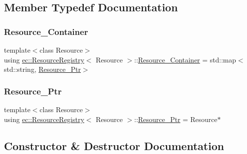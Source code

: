 \subsection{Member Typedef Documentation}
\mbox{\label{classec_1_1_resource_registry_a0a2b5090a2bbc638a04a2c283812b956}} 
\subsubsection{\texorpdfstring{Resource\+\_\+\+Container}{Resource\_Container}}
{\footnotesize\ttfamily template$<$class Resource$>$ \\
using \mbox{\hyperlink{classec_1_1_resource_registry}{ec\+::\+Resource\+Registry}}$<$ Resource $>$\+::\mbox{\hyperlink{classec_1_1_resource_registry_a0a2b5090a2bbc638a04a2c283812b956}{Resource\+\_\+\+Container}} =  std\+::map$<$std\+::string, \mbox{\hyperlink{classec_1_1_resource_registry_a77cf5381229bff47d251603c783115fe}{Resource\+\_\+\+Ptr}}$>$}

\mbox{\label{classec_1_1_resource_registry_a77cf5381229bff47d251603c783115fe}} 
\subsubsection{\texorpdfstring{Resource\+\_\+\+Ptr}{Resource\_Ptr}}
{\footnotesize\ttfamily template$<$class Resource$>$ \\
using \mbox{\hyperlink{classec_1_1_resource_registry}{ec\+::\+Resource\+Registry}}$<$ Resource $>$\+::\mbox{\hyperlink{classec_1_1_resource_registry_a77cf5381229bff47d251603c783115fe}{Resource\+\_\+\+Ptr}} =  Resource$\ast$}



\subsection{Constructor \& Destructor Documentation}
\mbox{\label{classec_1_1_resource_registry_a9e0fdc82b578be6f0477f61116d5b361}} 
